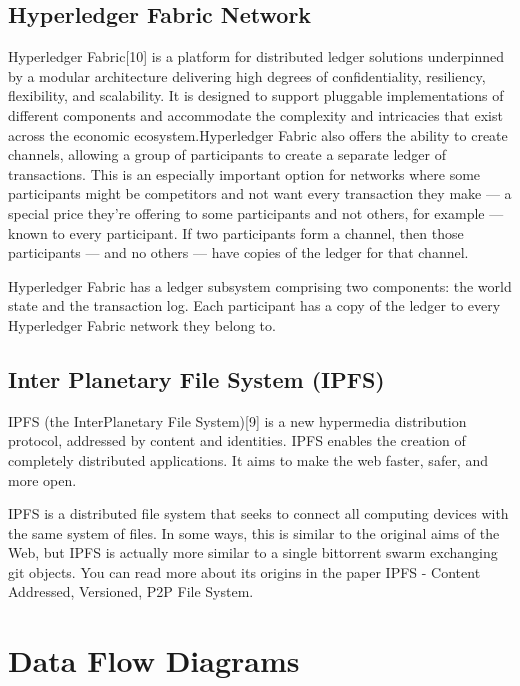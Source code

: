 \documentclass[11pt]{report}
\begin{document}
\subsection{Hyperledger Fabric Network}
Hyperledger Fabric[10] is a platform for distributed ledger solutions underpinned by a modular architecture delivering high degrees of confidentiality, resiliency, flexibility, and scalability. It is designed to support pluggable implementations of different components and accommodate the complexity and intricacies that exist across the economic ecosystem.Hyperledger Fabric also offers the ability to create channels, allowing a group of participants to create a separate ledger of transactions. This is an especially important option for networks where some participants might be competitors and not want every transaction they make — a special price they’re offering to some participants and not others, for example — known to every participant. If two participants form a channel, then those participants — and no others — have copies of the ledger for that channel.
\par Hyperledger Fabric has a ledger subsystem comprising two components: the world state and the transaction log. Each participant has a copy of the ledger to every Hyperledger Fabric network they belong to.

\subsection{Inter Planetary File System (IPFS) }
IPFS (the InterPlanetary File System)[9] is a new hypermedia distribution protocol, addressed by content and identities. IPFS enables the creation of completely distributed applications. It aims to make the web faster, safer, and more open.
\par IPFS is a distributed file system that seeks to connect all computing devices with the same system of files. In some ways, this is similar to the original aims of the Web, but IPFS is actually more similar to a single bittorrent swarm exchanging git objects. You can read more about its origins in the paper IPFS - Content Addressed, Versioned, P2P File System.





\newpage
\section{Data Flow Diagrams}
\end{document}
